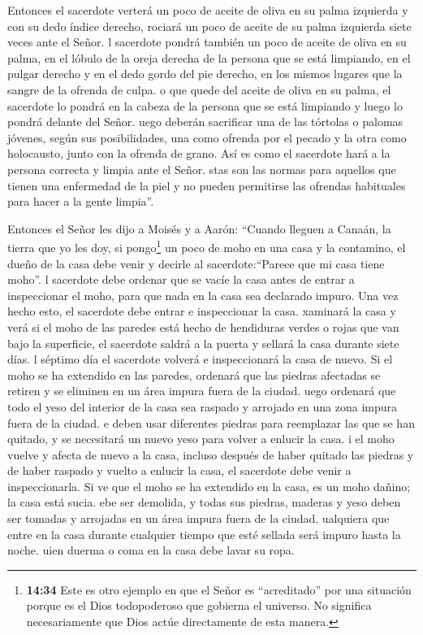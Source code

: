  Entonces el sacerdote verterá un poco de aceite de oliva
en su palma izquierda  y con su dedo índice derecho,
rociará un poco de aceite de su palma izquierda siete veces ante el
Señor.  l sacerdote pondrá también un poco de aceite de
oliva en su palma, en el lóbulo de la oreja derecha de la persona que se
está limpiando, en el pulgar derecho y en el dedo gordo del pie derecho,
en los mismos lugares que la sangre de la ofrenda de culpa.
 o que quede del aceite de oliva en su palma, el sacerdote
lo pondrá en la cabeza de la persona que se está limpiando y luego lo
pondrá delante del Señor.  uego deberán sacrificar una de
las tórtolas o palomas jóvenes, según sus posibilidades, 
una como ofrenda por el pecado y la otra como holocausto, junto con la
ofrenda de grano. Así es como el sacerdote hará a la persona correcta y
limpia ante el Señor.  stas son las normas para aquellos
que tienen una enfermedad de la piel y no pueden permitirse las ofrendas
habituales para hacer a la gente limpia''.

 Entonces el Señor les dijo a Moisés y a Aarón:
 ``Cuando lleguen a Canaán, la tierra que yo les doy, si
pongo\footnote{\textbf{14:34} Este es otro ejemplo en que el Señor es
  ``acreditado'' por una situación porque es el Dios todopoderoso que
  gobierna el universo. No significa necesariamente que Dios actúe
  directamente de esta manera.} un poco de moho en una casa y la
contamino,  el dueño de la casa debe venir y decirle al
sacerdote:``Parece que mi casa tiene moho''.  l sacerdote
debe ordenar que se vacíe la casa antes de entrar a inspeccionar el
moho, para que nada en la casa sea declarado impuro. Una vez hecho esto,
el sacerdote debe entrar e inspeccionar la casa.  xaminará
la casa y verá si el moho de las paredes está hecho de hendiduras verdes
o rojas que van bajo la superficie,  el sacerdote saldrá a
la puerta y sellará la casa durante siete días.  l séptimo
día el sacerdote volverá e inspeccionará la casa de nuevo. Si el moho se
ha extendido en las paredes,  ordenará que las piedras
afectadas se retiren y se eliminen en un área impura fuera de la ciudad.
 uego ordenará que todo el yeso del interior de la casa sea
raspado y arrojado en una zona impura fuera de la ciudad. 
e deben usar diferentes piedras para reemplazar las que se han quitado,
y se necesitará un nuevo yeso para volver a enlucir la casa.
 i el moho vuelve y afecta de nuevo a la casa, incluso
después de haber quitado las piedras y de haber raspado y vuelto a
enlucir la casa,  el sacerdote debe venir a inspeccionarla.
Si ve que el moho se ha extendido en la casa, es un moho dañino; la casa
está sucia.  ebe ser demolida, y todas sus piedras, maderas
y yeso deben ser tomadas y arrojadas en un área impura fuera de la
ciudad.  ualquiera que entre en la casa durante cualquier
tiempo que esté sellada será impuro hasta la noche.  uien
duerma o coma en la casa debe lavar su ropa.


